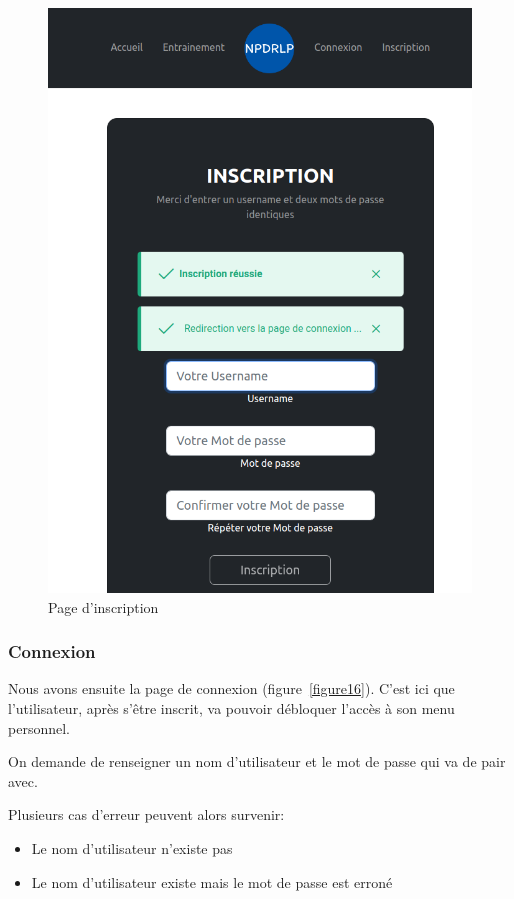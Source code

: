 \documentclass[12pt,french]{article}
\begin{document}
\begin{figure}[H]
\begin{minipage}{.5\textwidth}
		\includegraphics[scale=0.25]{inscri2.png}
	\end{minipage}
	\caption{Page d'inscription}
	\label{figure15} 
\end{figure}

\subsubsection{Connexion}

Nous avons ensuite la page de connexion (figure~\ref{figure16}). C'est ici que l'utilisateur, après s'être inscrit, va pouvoir débloquer l'accès à son menu personnel.

On demande de renseigner un nom d'utilisateur et le mot de passe qui va de pair avec.

Plusieurs cas d'erreur peuvent alors survenir:

\begin{itemize}
	\item Le nom d'utilisateur n'existe pas
	\item Le nom d'utilisateur existe mais le mot de passe est erroné
\end{itemize}
\end{document}
